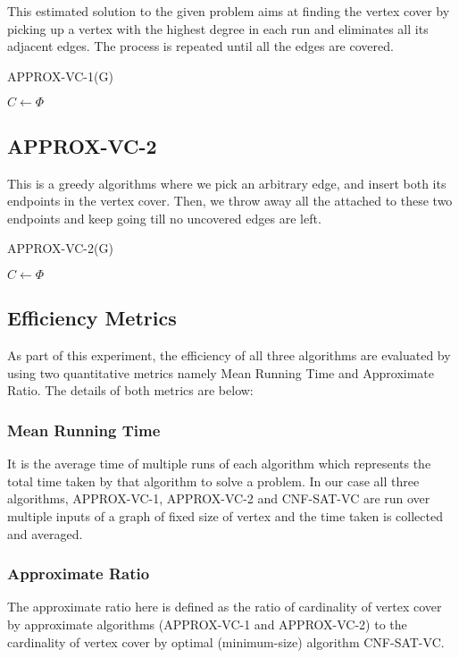 \documentclass{article}
\begin{document}
This estimated solution to the given problem aims at finding the vertex cover by picking up a vertex with the highest degree in each run and eliminates all its adjacent edges. The process is repeated until all the edges are covered. \\

\begin{algorithm}[H]
\caption{APPROX-VC-1(G)}\label{alg:one}
$C\gets \Phi$\;
\end{algorithm}


\subsection{APPROX-VC-2}

This is a greedy algorithms where we pick an arbitrary edge, and insert both its endpoints in the vertex cover. Then, we throw away all the attached to these two endpoints and keep going till no uncovered edges are left. \\

\begin{algorithm}[H]
\caption{APPROX-VC-2(G)}\label{alg:two}
$C\gets \Phi$\;
\end{algorithm}

\subsection{Efficiency Metrics}
As part of this experiment, the efficiency of all three algorithms are evaluated by using two quantitative metrics namely Mean Running Time and Approximate Ratio. The details of both metrics are below:

\subsubsection{Mean Running Time}
It is the average time of multiple runs of each algorithm which represents the total time taken by that algorithm to solve a problem. In our case all three algorithms, APPROX-VC-1, APPROX-VC-2 and CNF-SAT-VC are run over multiple inputs of a graph of fixed size of vertex and the time taken is collected and averaged.

\subsubsection{Approximate Ratio}
The approximate ratio here is defined as the ratio of cardinality of vertex cover by  approximate algorithms (APPROX-VC-1 and APPROX-VC-2) to the cardinality of vertex cover by optimal (minimum-size) algorithm CNF-SAT-VC.
\end{document}
